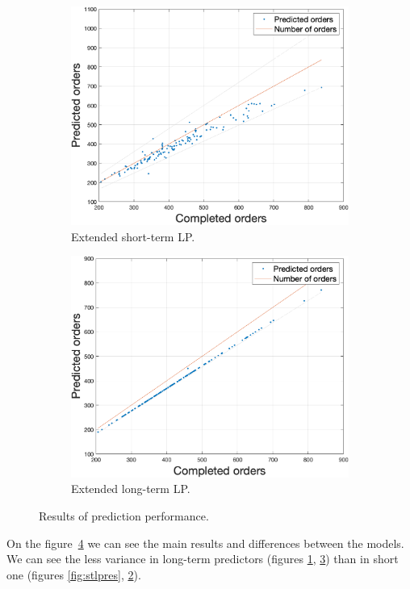 \begin{figure}[h!]
\begin{subfigure}[b]{0.4\textwidth}
            \label{fig:eltlpres}
        \end{subfigure}
        \begin{subfigure}[b]{0.4\textwidth}
            \includegraphics[width=\textwidth]{figures/expCompELP.png}
            \caption{Extended short-term LP.}
            \label{fig:eslpmse}
        \end{subfigure}
        \hspace{0.1\textwidth}
        \begin{subfigure}[b]{0.4\textwidth}
            \includegraphics[width=\textwidth]{figures/expCompELTLP.png}
            \caption{Extended long-term LP.}
            \label{fig:eltlpmse}
        \end{subfigure}
        \caption{Results of prediction performance.}
        \label{fig:mseresults}
    \end{figure}
    
    On the figure~\ref{fig:mseresults} we can see the main results and
    differences between the models. We can see the less variance in
    long-term predictors (figures \ref{fig:eltlpres}, \ref{fig:eltlpmse})
    than in short one (figures \ref{fig:stlpres}, \ref{fig:eslpmse}).
